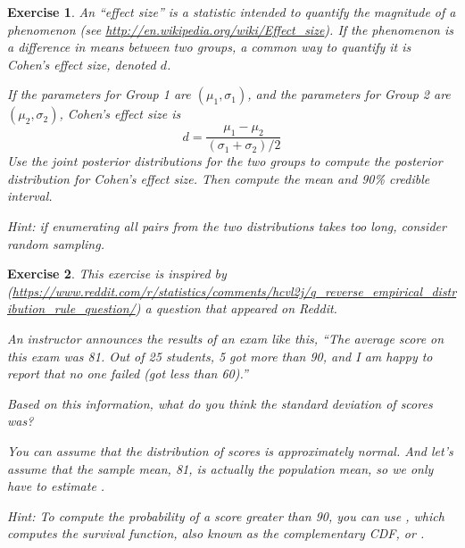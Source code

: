 \documentclass[12pt]{book}
\theoremstyle{exercise}
\newtheorem{exercise}{Exercise}[chapter]
\begin{document}
\begin{exercise}
An ``effect size'' is a statistic intended to quantify the magnitude of a phenomenon (see \url{http://en.wikipedia.org/wiki/Effect_size}).
If the phenomenon is a difference in means between two groups, a common way to quantify it is Cohen's effect size, denoted $d$.

If the parameters for Group 1 are $(\mu_1, \sigma_1)$, and the
parameters for Group 2 are $(\mu_2, \sigma_2)$, Cohen's
effect size is
%
\[ d = \frac{\mu_1 - \mu_2}{(\sigma_1 + \sigma_2)/2} \]
%
Use the joint posterior distributions for the two groups to compute the posterior distribution for Cohen's effect size.
Then compute the mean and 90\% credible interval. 

Hint: if enumerating all pairs from the two distributions takes too
long, consider random sampling.
\end{exercise}


\begin{exercise} 
This exercise is inspired by
(\url{https://www.reddit.com/r/statistics/comments/hcvl2j/q_reverse_empirical_distribution_rule_question/}) a
question that appeared on Reddit.

An instructor announces the results of an exam like this, ``The average
score on this exam was 81. Out of 25 students, 5 got more than 90, and I
am happy to report that no one failed (got less than 60).''

Based on this information, what do you think the standard deviation of
scores was?

You can assume that the distribution of scores is approximately normal.
And let's assume that the sample mean, 81, is actually the population
mean, so we only have to estimate .

Hint: To compute the probability of a score greater than 90, you can use
, which computes the survival function,
also known as the complementary CDF, or
.

\end{exercise}
\end{document}
